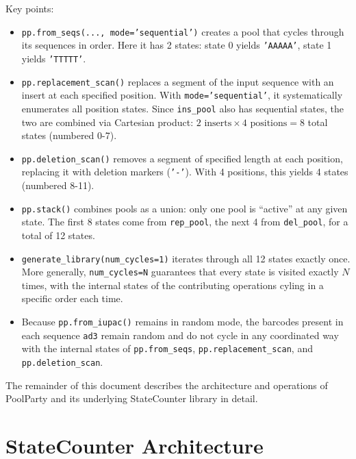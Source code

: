 \documentclass[11pt]{article}
\newcommand{\inpy}[1]{\texttt{#1}}
\begin{document}
Key points:
\begin{itemize}
    \item \inpy{pp.from_seqs(..., mode='sequential')} creates a pool that cycles through its sequences in order. Here it has 2 states: state 0 yields \inpy{'AAAAA'}, state 1 yields \inpy{'TTTTT'}.

    \item \inpy{pp.replacement_scan()} replaces a segment of the input sequence with an insert at each specified position. With \inpy{mode='sequential'}, it systematically enumerates all position states. Since \inpy{ins_pool} also has sequential states, the two are combined via Cartesian product: $2 \text{ inserts} \times 4 \text{ positions} = 8$ total states (numbered 0-7).

    \item \inpy{pp.deletion_scan()} removes a segment of specified length at each position, replacing it with deletion markers (\inpy{'-'}). With 4 positions, this yields 4 states (numbered 8-11).

    \item \inpy{pp.stack()} combines pools as a union: only one pool is ``active'' at any given state. The first 8 states come from \inpy{rep_pool}, the next 4 from \inpy{del_pool}, for a total of 12 states.

    \item \inpy{generate_library(num_cycles=1)} iterates through all 12 states exactly once. More generally, \inpy{num_cycles=N} guarantees that every state is visited exactly $N$ times, with the internal states of the contributing operations cyling in a specific order each time.

    \item Because \inpy{pp.from_iupac()} remains in random mode, the barcodes present in each sequence \inpy{ad3} remain random and do not cycle in any coordinated way with the internal states of \inpy{pp.from_seqs}, \inpy{pp.replacement_scan}, and \inpy{pp.deletion_scan}.
\end{itemize}

\medskip
\noindent The remainder of this document describes the architecture and operations of
PoolParty and its underlying StateCounter library in detail.
\newpage



\section{StateCounter Architecture}
\label{sec:statecounter-architecture}
\end{document}
